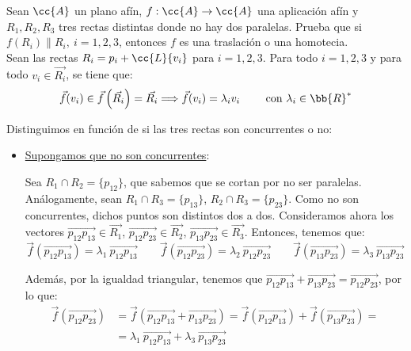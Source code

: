 \begin{ejercicio}
    Sean $\cc{A}$ un plano afín, $f : \cc{A} \to \cc{A}$ una aplicación afín y ${R}_1, {R}_2, {R}_3$ tres rectas distintas donde no hay dos paralelas. Prueba que si $f(R_i) \| R_i,~i = 1, 2, 3$, entonces $f$ es una traslación o una homotecia.\\

    Sean las rectas $R_i=p_i+\cc{L}\{v_i\}$ para $i=1,2,3$. Para todo $i=1,2,3$ y para todo $v_i\in \vec{R_i}$,
    se tiene que:
    \begin{equation*}
        \vec{f}(v_i) \in {\vec{f}\left(\vec{R_i}\right)} = \vec{R_i} \Longrightarrow \vec{f}(v_i) = \lambda_i v_i
        \qquad\text{ con } \lambda_i\in \bb{R}^\ast
    \end{equation*}

    Distinguimos en función de si las tres rectas son concurrentes o no:
    \begin{itemize}
        \item \ul{Supongamos que no son concurrentes}:
        
        Sea $R_1\cap R_2 = \{p_{12}\}$, que sabemos que se cortan por no ser paralelas. Análogamente, sean $R_1\cap R_3 = \{p_{13}\}$, $R_2\cap R_3 = \{p_{23}\}$.
        Como no son concurrentes, dichos puntos son distintos dos a dos. Consideramos ahora los vectores $\vec{p_{12}p_{13}}\in \vec{R_1}$, $\vec{p_{12}p_{23}}\in \vec{R_2}$,
        $\vec{p_{13}p_{23}}\in \vec{R_3}$. Entonces, tenemos que:
        \begin{equation*}
            \vec{f}(\vec{p_{12}p_{13}}) = \lambda_1~ \vec{p_{12}p_{13}} \qquad
            \vec{f}(\vec{p_{12}p_{23}}) = \lambda_2~ \vec{p_{12}p_{23}} \qquad
            \vec{f}(\vec{p_{13}p_{23}}) = \lambda_3~ \vec{p_{13}p_{23}}
        \end{equation*}

        Además, por la igualdad triangular, tenemos que $\vec{p_{12}p_{13}}+\vec{p_{13}p_{23}}=\vec{p_{12}p_{23}}$, por lo que:
        \begin{equation*}
            \begin{split}
                \vec{f}(\vec{p_{12}p_{23}}) &= \vec{f}(\vec{p_{12}p_{13}}+\vec{p_{13}p_{23}}) = \vec{f}(\vec{p_{12}p_{13}})+\vec{f}(\vec{p_{13}p_{23}}) =\\
                &= \lambda_1~ \vec{p_{12}p_{13}} + \lambda_3~ \vec{p_{13}p_{23}}
            \end{split}
        \end{equation*}


\end{itemize}
\end{ejercicio}
